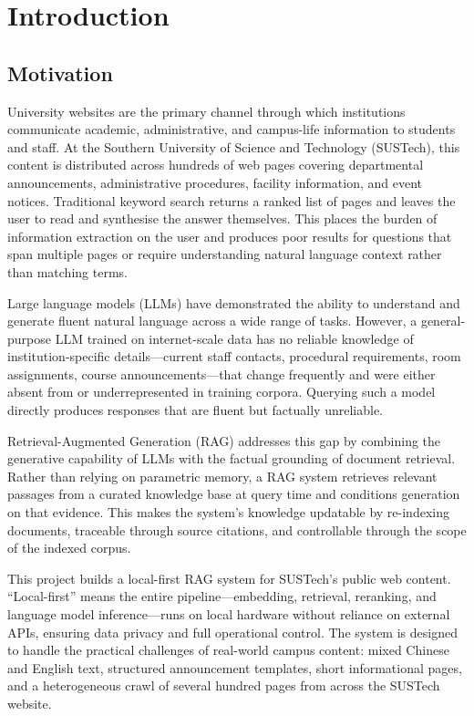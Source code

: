 \chapter{Introduction}
\section{Motivation}

University websites are the primary channel through which institutions communicate academic, administrative, and campus-life information to students and staff. At the Southern University of Science and Technology (SUSTech), this content is distributed across hundreds of web pages covering departmental announcements, administrative procedures, facility information, and event notices. Traditional keyword search returns a ranked list of pages and leaves the user to read and synthesise the answer themselves. This places the burden of information extraction on the user and produces poor results for questions that span multiple pages or require understanding natural language context rather than matching terms.

Large language models (LLMs) have demonstrated the ability to understand and generate fluent natural language across a wide range of tasks. However, a general-purpose LLM trained on internet-scale data has no reliable knowledge of institution-specific details---current staff contacts, procedural requirements, room assignments, course announcements---that change frequently and were either absent from or underrepresented in training corpora. Querying such a model directly produces responses that are fluent but factually unreliable.

Retrieval-Augmented Generation (RAG) \parencite{rag2020} addresses this gap by combining the generative capability of LLMs with the factual grounding of document retrieval. Rather than relying on parametric memory, a RAG system retrieves relevant passages from a curated knowledge base at query time and conditions generation on that evidence. This makes the system's knowledge updatable by re-indexing documents, traceable through source citations, and controllable through the scope of the indexed corpus.

This project builds a local-first RAG system for SUSTech's public web content. ``Local-first'' means the entire pipeline---embedding, retrieval, reranking, and language model inference---runs on local hardware without reliance on external APIs, ensuring data privacy and full operational control. The system is designed to handle the practical challenges of real-world campus content: mixed Chinese and English text, structured announcement templates, short informational pages, and a heterogeneous crawl of several hundred pages from across the SUSTech website.

